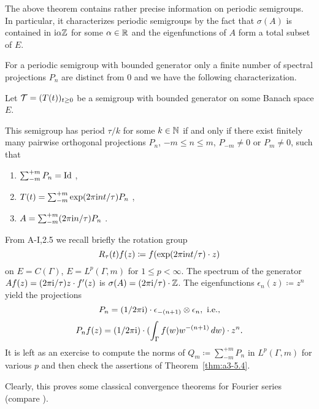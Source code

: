 The above theorem contains rather precise information on periodic semigroups.
In particular, it characterizes periodic semigroups by the fact that $\sigma(A)$ is contained in $\mathrm{i}\alpha\mathbb{Z}$ for some $\alpha \in \mathbb{R}$ and the eigenfunctions of $A$ form a total subset of $E$.

For a periodic semigroup with bounded generator
only a finite number of spectral projections $P_{n}$ are distinct from $0$ and we have the following characterization.
\begin{corollary}\label{cor:a3-5.5}
Let $\mathcal{T} = (T(t))_{t \geq 0}$ be a semigroup with bounded generator on some Banach space $E$.

This semigroup has period $\tau/k$ for some $k \in \mathbb{N}$ if and only if there exist finitely many pairwise orthogonal projections $P_{n}$, $-m \leq n \leq m$, $P_{-m} \neq 0$ or $P_{m} \neq 0$, such that
\begin{enumerate}[\upshape (i)]
\item 
$\sum_{-m}^{+m} P_{n} =  \operatorname{Id}$ ,

\item 
$T(t) = \sum_{-m}^{+m} \exp(2\pi\mathrm{i} nt/\tau)P_{n}$ ,

\item 
$A = \sum_{-m}^{+m} (2\pi\mathrm{i} n/\tau)P_{n}$ .

\end{enumerate}
\end{corollary}
\begin{example}\label{ex:a3-5.6}
From A-I,2.5 we recall briefly the rotation group
\[
R_{\tau}(t)f(z) \coloneqq f(\exp(2\pi\mathrm{i} nt/\tau) \cdot z)
\]
on $E = C(\Gamma)$, \resp $E = L^{p}(\Gamma,m)$ for $1 \leq p < \infty$.
The spectrum of the generator\quad
$Af(z) = (2\pi\mathrm{i} /\tau)z \cdot f'(z)$\quad
is \quad $\sigma(A) = (2\pi\mathrm{i} /\tau)\cdot\mathbb{Z}$.
The eigenfunctions $\epsilon_{n}(z) \coloneqq z^{n}$ yield the projections
\[
P_{n} = (1/2\pi\mathrm{i} )\cdot\epsilon_{-(n+1)} \otimes \epsilon_{n}, \text{ i.e.,}
\]
\[
P_{n}f(z) = (1/2\pi\mathrm{i} )\cdot(\int_{\Gamma} f(w)w^{-(n+1)} \, dw)\cdot z^{n} .
\]
It is left as an exercise to compute the norms of $Q_{m} \coloneqq \sum_{-m}^{+m} P_{n}$ in $L^{p}(\Gamma,m)$ for various $p$ and then check the assertions of Theorem~\ref{thm:a3-5.4}.

Clearly, this proves some classical convergence theorems for Fourier series (compare \citet[Chap.8.1]{davies:1980}).
\end{example}


